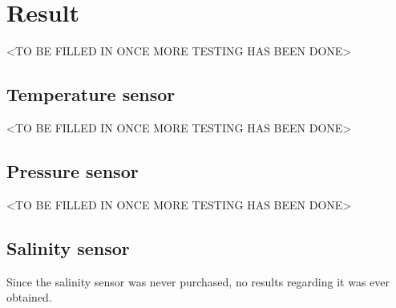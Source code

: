 
\section{Result}\label{sec:result}
<TO BE FILLED IN ONCE MORE TESTING HAS BEEN DONE>

\subsection{Temperature sensor}
<TO BE FILLED IN ONCE MORE TESTING HAS BEEN DONE>

\subsection{Pressure sensor}
<TO BE FILLED IN ONCE MORE TESTING HAS BEEN DONE>

\subsection{Salinity sensor}
Since the salinity sensor was never purchased, no results regarding it was ever obtained.

